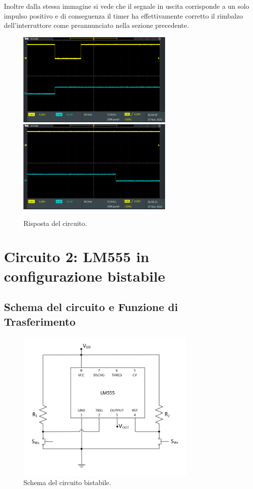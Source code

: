 \documentclass{report}
\begin{document}
Inoltre dalla stessa immagine si vede che il segnale in uscita corrisponde a un solo impulso positivo e di conseguenza il timer ha effettivamente corretto il rimbalzo dell'interruttore come preannunciato nella sezione precedente.

\begin{figure}[h!]
	\centering
	\includegraphics[height=4.6cm]{immagini/TEK00016}
	\includegraphics[height=4.6cm]{immagini/TEK00017}
	\caption{Risposta del circuito.}
	\label{figura:TEK00016e17}
\end{figure}

\newpage
\section{Circuito 2: LM555 in configurazione bistabile}\label{sez2}
\subsection{Schema del circuito e Funzione di Trasferimento}

\begin{figure}[h!]
	\centering
	\includegraphics[height=7.5cm]{immagini/schema2}
	\caption{Schema del circuito bistabile.}
	\label{figura:schema2}
\end{figure}
\end{document}
